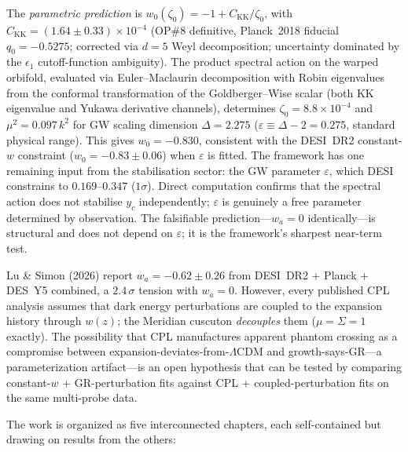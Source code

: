 \documentclass[10pt,a4paper,openany,twocolumn]{book}
\theoremstyle{definition}
\theoremstyle{remark}
\begin{document}
The \emph{parametric prediction} is $w_0(\zeta_0) = -1 + C_{\mathrm{KK}}/\zeta_0$, with $C_{\mathrm{KK}} = (1.64 \pm 0.33) \times 10^{-4}$ (OP\#8 definitive, Planck~2018 fiducial $q_0 = -0.5275$; corrected via $d = 5$ Weyl decomposition; uncertainty dominated by the $\epsilon_1$ cutoff-function ambiguity).  The product spectral action on the warped orbifold, evaluated via Euler--Maclaurin decomposition with Robin eigenvalues from the conformal transformation of the Goldberger--Wise scalar (both KK eigenvalue and Yukawa derivative channels), determines $\zeta_0 = 8.8 \times 10^{-4}$ and $\mu^2 = 0.097\, k^2$ for GW scaling dimension $\Delta = 2.275$ ($\varepsilon \equiv \Delta - 2 = 0.275$, standard physical range).  This gives $w_0 = -0.830$, consistent with the DESI~DR2 constant-$w$ constraint ($w_0 = -0.83 \pm 0.06$) when $\varepsilon$ is fitted.  The framework has one remaining input from the stabilisation sector: the GW parameter $\varepsilon$, which DESI constrains to $0.169$--$0.347$ ($1\sigma$).  Direct computation confirms that the spectral action does not stabilise $y_c$ independently; $\varepsilon$ is genuinely a free parameter determined by observation. The falsifiable prediction---$w_a = 0$ identically---is structural and does not depend on $\varepsilon$; it is the framework's sharpest near-term test.

Lu \& Simon (2026) report $w_a = -0.62 \pm 0.26$ from DESI~DR2 + Planck + DES~Y5 combined, a $2.4\,\sigma$ tension with $w_a = 0$. However, every published CPL analysis assumes that dark energy perturbations are coupled to the expansion history through $w(z)$; the Meridian cuscuton \emph{decouples} them ($\mu = \Sigma = 1$ exactly). The possibility that CPL manufactures apparent phantom crossing as a compromise between expansion-deviates-from-$\Lambda$CDM and growth-says-GR---a parameterization artifact---is an open hypothesis that can be tested by comparing constant-$w$ + GR-perturbation fits against CPL + coupled-perturbation fits on the same multi-probe data.

The work is organized as five interconnected chapters, each self-contained but drawing on results from the others:
\end{document}
